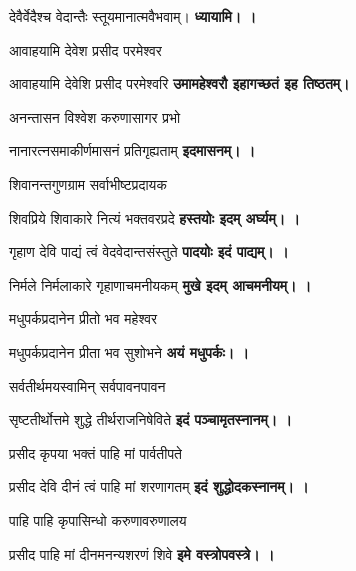 \begin{center}
देवैर्वेदैश्च वेदान्तैः स्तूयमानात्मवैभवाम्।
\textbf{ध्यायामि। \devAya{}।}
\medskip

{आवाहयामि देवेश प्रसीद परमेश्वर}

{आवाहयामि देवेशि प्रसीद परमेश्वरि}
\textbf{उमामहेश्वरौ इहागच्छतं इह तिष्ठतम्।}
\medskip

{अनन्तासन विश्वेश करुणासागर प्रभो}

{नानारत्नसमाकीर्णमासनं प्रतिगृह्यताम्}
\textbf{इदमासनम्। \devAya{}।}
\medskip

{शिवानन्तगुणग्राम सर्वाभीष्टप्रदायक}

{शिवप्रिये शिवाकारे नित्यं भक्तवरप्रदे}
\textbf{हस्तयोः इदम् अर्घ्यम्। \devAya{}।}
\medskip

{गृहाण देवि पाद्यं त्वं वेदवेदान्तसंस्तुते}
\textbf{पादयोः इदं पाद्यम्। \devAya{}।}
\medskip

{निर्मले निर्मलाकारे गृहाणाचमनीयकम्}
\textbf{मुखे इदम् आचमनीयम्। \devAya{}।}
\medskip

{मधुपर्कप्रदानेन प्रीतो भव महेश्वर}

{मधुपर्कप्रदानेन प्रीता भव सुशोभने}
\textbf{अयं मधुपर्कः। \devAya{}।}
\medskip

{सर्वतीर्थमयस्वामिन् सर्वपावनपावन}

{सृष्टतीर्थोत्तमे शुद्धे तीर्थराजनिषेविते}
\textbf{इदं पञ्चामृतस्नानम्। \devAya{}।}
\medskip

{प्रसीद कृपया भक्तं पाहि मां पार्वतीपते}

{प्रसीद देवि दीनं त्वं पाहि मां शरणागतम्}
\textbf{इदं शुद्धोदकस्नानम्। \devAya{}।}
\medskip

{पाहि पाहि कृपासिन्धो करुणावरुणालय}

{प्रसीद पाहि मां दीनमनन्यशरणं शिवे}
\textbf{इमे वस्त्रोपवस्त्रे। \devAya{}।}
\medskip


\end{center}
